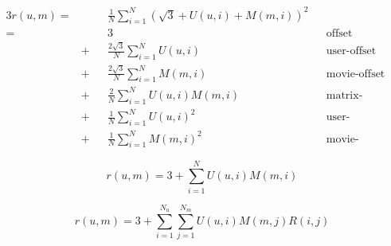 \documentclass{article}
\begin{document}
\begin{alignat*}{3}
r(u,m)= & &&\frac{1}{N}\sum_{i=1}^{N}(\sqrt{3}+U(u,i)+M(m,i))^2 && \\
=& &&3 &&\text{offset} \\
&+ &&\frac{2\sqrt{3}}{N}\sum_{i=1}^{N}U(u,i) &&\text{user-offset} \\
&+ &&\frac{2\sqrt{3}}{N}\sum_{i=1}^{N}M(m,i) &&\text{movie-offset} \\
&+ &&\frac{2}{N}\sum_{i=1}^{N}U(u,i)M(m,i) &&\text{matrix-factorization-"convolution"?} \\
&+ &&\frac{1}{N}\sum_{i=1}^{N}U(u,i)^2 &&\text{user-"regularization"} \\
&+ &&\frac{1}{N}\sum_{i=1}^{N}M(m,i)^2 &&\text{movie-"regularization"}
\end{alignat*}

\[
r(u,m)=3+\sum_{i=1}^{N}U(u,i)M(m,i)
\]

\[
r(u,m)=3+\sum_{i=1}^{N_u}\sum_{j=1}^{N_m}U(u,i)M(m,j)R(i,j)
\]
\end{document}
